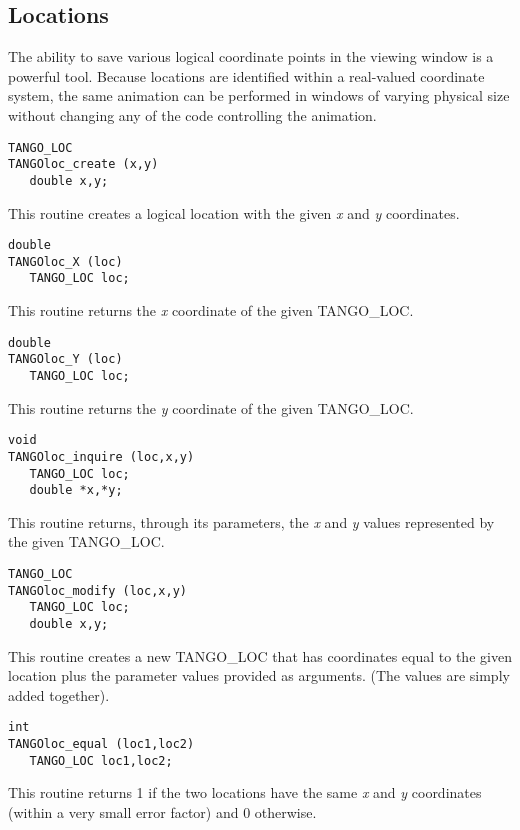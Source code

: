 \subsection{Locations}
The ability to save various logical coordinate points in the viewing window
is a powerful tool.  Because locations are identified within a real-valued
coordinate system, the same animation can be performed in windows of varying
physical size without changing any of the code controlling the animation.

\vspace{1em}
\begin{verbatim}
TANGO_LOC
TANGOloc_create (x,y) 
   double x,y;
\end{verbatim}
This routine creates a logical location with the given {\em x} and
{\em y}
coordinates.

\vspace{1em}
\begin{verbatim}
double
TANGOloc_X (loc) 
   TANGO_LOC loc;
\end{verbatim}
This routine returns the {\em x} coordinate of the given TANGO\_LOC.

\vspace{1em}
\begin{verbatim}
double
TANGOloc_Y (loc) 
   TANGO_LOC loc;
\end{verbatim}
This routine returns the {\em y} coordinate of the given TANGO\_LOC.

\vspace{1em}
\begin{verbatim}
void
TANGOloc_inquire (loc,x,y) 
   TANGO_LOC loc;
   double *x,*y;
\end{verbatim}
This routine returns, through its parameters, the {\em x} and {\em y}
values represented by the given TANGO\_LOC.

\vspace{1em}
\begin{verbatim}
TANGO_LOC
TANGOloc_modify (loc,x,y) 
   TANGO_LOC loc;
   double x,y;
\end{verbatim}
This routine creates a new TANGO\_LOC that has coordinates equal to the given
location plus the parameter values provided as arguments. (The values are
simply added together).

\vspace{1em}
\begin{verbatim}
int
TANGOloc_equal (loc1,loc2) 
   TANGO_LOC loc1,loc2;
\end{verbatim}
This routine returns 1 if the two locations have the same {\em x}
and {\em y} coordinates (within a very small error factor) and 0 otherwise.

